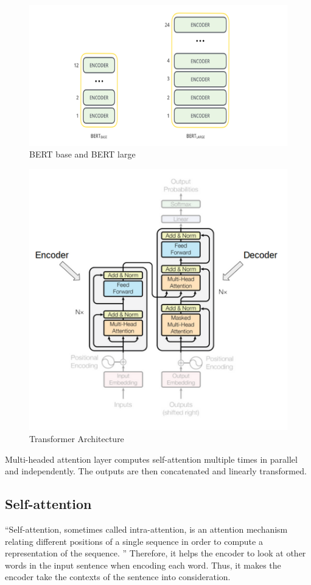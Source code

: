 \documentclass[conference]{IEEEtran}
\begin{document}
	\begin{figure}[!htbp]
		\centering
		\includegraphics{figures/figure1.png}
		\caption{\label{fig:my-label} BERT base and BERT large \cite{BERT}}
	\end{figure}

	\begin{figure}[!htbp]
		\centering
		\includegraphics{figures/figure2.png}
		\caption{\label{fig:my-label} Transformer Architecture \cite{BERT}}
	\end{figure}
	
	Multi-headed attention layer computes self-attention multiple times in parallel and independently. The outputs are then concatenated and linearly transformed.\\
	
	\subsection{Self-attention}
	“Self-attention, sometimes called intra-attention, is an attention mechanism relating different positions of a single sequence in order to compute a representation of the sequence. \cite{attention}” Therefore, it helps the encoder to look at other words in the input sentence when encoding each word. Thus, it makes the encoder take the contexts of the sentence into consideration.\\
	
\end{document}
